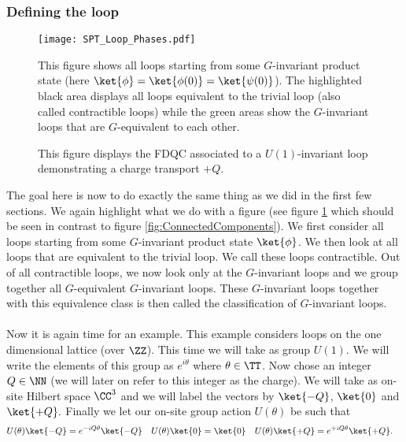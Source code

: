 \subsubsection{Defining the loop}
\begin{figure}
	\centering
	\texttt{[image: SPT\_Loop\_Phases.pdf]}
	\caption{This figure shows all loops starting from some $G$-invariant product state (here $\ket{\phi}=\ket{\phi(0)}=\ket{\psi(0)}$). The highlighted black area displays all loops equivalent to the trivial loop (also called contractible loops) while the green areas show the $G$-invariant loops that are $G$-equivalent to each other.}
	\label{fig:ConnectedComponentsLoops}
\end{figure}
\begin{figure}
	\centering
	\scalebox{0.78}{
		
	}
	\caption{This figure displays the FDQC associated to a $U(1)$-invariant loop demonstrating a charge transport $+Q$.}
	\label{fig:U1_ThoulessPumpAs_FiniteDepthQuantumCircuit}
\end{figure}
The goal here is now to do exactly the same thing as we did in the first few sections. We again highlight what we do with a figure (see figure \ref{fig:ConnectedComponentsLoops} which should be seen in contrast to figure \ref{fig:ConnectedComponents}). We first consider all loops starting from some $G$-invariant product state $\ket{\phi}$. We then look at all loops that are equivalent to the trivial loop. We call these loops contractible. Out of all contractible loops, we now look only at the $G$-invariant loops and we group together all $G$-equivalent $G$-invariant loops. These $G$-invariant loops together with this equivalence class is then called the classification of $G$-invariant loops.\\\\
Now it is again time for an example. This example considers loops on the one dimensional lattice (over $\ZZ$). This time we will take as group $U(1)$. We will write the elements of this group as $e^{i\theta}$ where $\theta\in\TT$. Now chose an integer $Q\in\NN$ (we will later on refer to this integer as the charge). We will take as on-site Hilbert space $\CC^3$ and we will label the vectors by $\ket{-Q}$, $\ket{0}$ and $\ket{+Q}.$ Finally we let our on-site group action $U(\theta)$ be such that
\begin{align}
U(\theta)\ket{-Q}&=e^{-i Q\theta}\ket{-Q}&U(\theta)\ket{0}&=\ket{0}&U(\theta)\ket{+Q}&=e^{+iQ\theta}\ket{+Q}.
\end{align}

